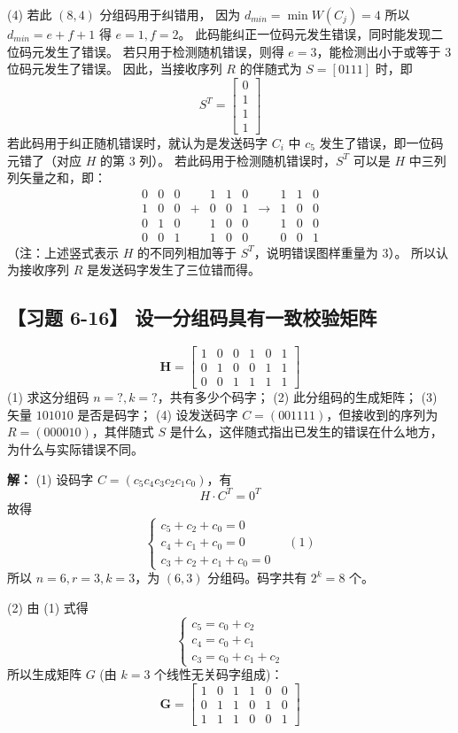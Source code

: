 \documentclass[11pt, a4paper]{article}
\begin{document}
(4) 若此 $(8, 4)$ 分组码用于纠错用，
因为 $d_{min} = \min W(C_j) = 4$
所以 $d_{min} = e + f + 1$
得 $e=1, f=2$。
此码能纠正一位码元发生错误，同时能发现二位码元发生了错误。
若只用于检测随机错误，则得 $e=3$，能检测出小于或等于 3 位码元发生了错误。
因此，当接收序列 $R$ 的伴随式为 $S=[0111]$ 时，即
\[ S^T = \begin{bmatrix} 0 \\ 1 \\ 1 \\ 1 \end{bmatrix} \]
若此码用于纠正随机错误时，就认为是发送码字 $C_i$ 中 $c_5$ 发生了错误，即一位码元错了（对应 $H$ 的第 3 列）。
若此码用于检测随机错误时，$S^T$ 可以是 $H$ 中三列列矢量之和，即：
\[
\begin{array}{ccccccccccc}
0 & 0 & 0 & & 1 & 1 & 0 & & 1 & 1 & 0 \\
1 & 0 & 0 & + & 0 & 0 & 1 & \to & 1 & 0 & 0 \\
0 & 1 & 0 & & 1 & 0 & 0 & & 1 & 0 & 0 \\
0 & 0 & 1 & & 1 & 0 & 0 & & 0 & 0 & 1
\end{array}
\]
（注：上述竖式表示 $H$ 的不同列相加等于 $S^T$，说明错误图样重量为 3）。
所以认为接收序列 $R$ 是发送码字发生了三位错而得。

\subsection*{【习题 6-16】 设一分组码具有一致校验矩阵}
\[
\mathbf{H} = \begin{bmatrix}
1 & 0 & 0 & 1 & 0 & 1 \\
0 & 1 & 0 & 0 & 1 & 1 \\
0 & 0 & 1 & 1 & 1 & 1
\end{bmatrix}
\]
(1) 求这分组码 $n=?, k=?$，共有多少个码字；
(2) 此分组码的生成矩阵；
(3) 矢量 $101010$ 是否是码字；
(4) 设发送码字 $C=(001111)$，但接收到的序列为 $R=(000010)$，其伴随式 $S$ 是什么，这伴随式指出已发生的错误在什么地方，为什么与实际错误不同。

\textbf{解：}
(1) 设码字 $C=(c_5 c_4 c_3 c_2 c_1 c_0)$，有
\[ H \cdot C^T = 0^T \]
故得
\[
\begin{cases}
c_5 + c_2 + c_0 = 0 \\
c_4 + c_1 + c_0 = 0 \\
c_3 + c_2 + c_1 + c_0 = 0
\end{cases}
\quad (1)
\]
所以 $n=6, r=3, k=3$，为 $(6, 3)$ 分组码。码字共有 $2^k = 8$ 个。

(2) 由 (1) 式得
\[
\begin{cases}
c_5 = c_0 + c_2 \\
c_4 = c_0 + c_1 \\
c_3 = c_0 + c_1 + c_2
\end{cases}
\]
所以生成矩阵 $G$ (由 $k=3$ 个线性无关码字组成)：
\[
\mathbf{G} = \begin{bmatrix}
1 & 0 & 1 & 1 & 0 & 0 \\
0 & 1 & 1 & 0 & 1 & 0 \\
1 & 1 & 1 & 0 & 0 & 1
\end{bmatrix}
\]
\end{document}
